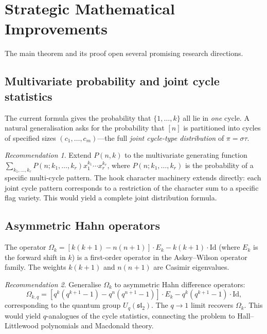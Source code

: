 \documentclass[12pt, a4paper]{amsart}
\theoremstyle{plain}
\theoremstyle{definition}
\theoremstyle{remark}
\newtheorem*{recommendation}{Recommendation}
\begin{document}
\section{Strategic Mathematical Improvements}
\label{sec:improvements}

The main theorem and its proof open several promising research directions.

\subsection{Multivariate probability and joint cycle statistics}

The current formula gives the probability that $\{1,\dots,k\}$ all lie in
\emph{one} cycle.  A natural generalisation asks for the probability that
$[n]$ is partitioned into cycles of specified sizes $(c_1,\dots,c_m)$—the
full \emph{joint cycle-type distribution} of $\pi=\sigma\tau$.

\begin{recommendation}
Extend $P(n,k)$ to the multivariate generating function
$\sum_{k_1,\dots,k_r} P(n;k_1,\dots,k_r)x_1^{k_1}\cdots x_r^{k_r}$,
where $P(n;k_1,\dots,k_r)$ is the probability of a specific multi-cycle
pattern.  The hook character machinery extends directly: each joint cycle
pattern corresponds to a restriction of the character sum to a specific
flag variety.  This would yield a complete joint distribution formula.
\end{recommendation}

\subsection{Asymmetric Hahn operators}

The operator $\Omega_k = [k(k+1)-n(n+1)]\cdot E_k - k(k+1)\cdot\mathrm{Id}$
(where $E_k$ is the forward shift in $k$) is a first-order operator in the
Askey--Wilson operator family.  The weights $k(k+1)$ and $n(n+1)$ are
Casimir eigenvalues.

\begin{recommendation}
Generalise $\Omega_k$ to asymmetric Hahn difference operators:
\[
  \Omega_{k,q} = [q^k(q^{k+1}-1) - q^n(q^{n+1}-1)]\cdot E_k - q^k(q^{k+1}-1)\cdot\mathrm{Id},
\]
corresponding to the quantum group $U_q(\mathfrak{sl}_2)$.  The $q\to 1$ limit
recovers $\Omega_k$.  This would yield $q$-analogues of the cycle statistics,
connecting the problem to Hall--Littlewood polynomials and Macdonald theory.
\end{recommendation}
\end{document}
